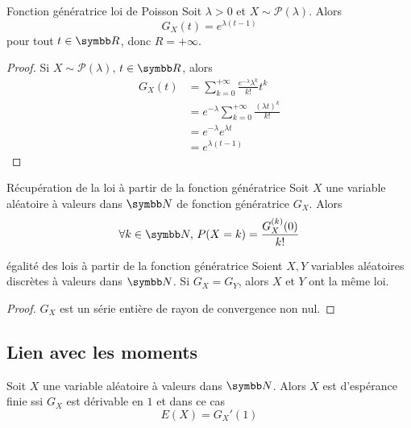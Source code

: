 \begin{proposition}{Fonction génératrice loi de Poisson}{}
    Soit $\lambda > 0$ et $X \sim \mathcal P(\lambda)$. Alors 
    $$ G_X(t) = e^{\lambda (t - 1)} $$
    pour tout $t \in \R$, donc $R = + \infty$.
\end{proposition}

\begin{proof}
    Si $X \sim \mathcal P(\lambda)$, $t \in \R$, alors
    \begin{align}
        G_X(t) & = \sum_{k = 0}^{+\infty} \frac{e^{- \lambda} \lambda^k}{k!} t^k \\
        & = e^{- \lambda} \sum_{k = 0}^{+\infty} \frac{(\lambda t)^k}{k!} \\
        & = e^{- \lambda} e^{\lambda t} \\
        & = e^{\lambda (t - 1)}
    \end{align}
\end{proof}

\begin{theoreme}{Récupération de la loi à partir de la fonction génératrice}{}
    Soit $X$ une variable aléatoire à valeurs dans $\N$ de fonction génératrice $G_X$.
    Alors $$\forall k \in \N, \, P(X = k) = \frac{G_X^{(k)}(0)}{k!}$$
\end{theoreme}

\begin{corollaire}{égalité des lois à partir de la fonction génératrice}{}
    Soient $X, Y$ variables aléatoires discrètes à valeurs dans $\N$.
    Si $G_X = G_Y$, alors $X$ et $Y$ ont la même loi.
\end{corollaire}

\begin{proof}
    $G_X$ est un série entière de rayon de convergence non nul. 
\end{proof}

\subsection{Lien avec les moments}

\begin{theoreme}{}{}
    Soit $X$ une variable aléatoire à valeurs dans $\N$. Alors $X$ est 
    d'espérance finie ssi $G_X$ est dérivable en $1$ et dans ce cas
    $$ E(X) = G_X'(1) $$
\end{theoreme}

